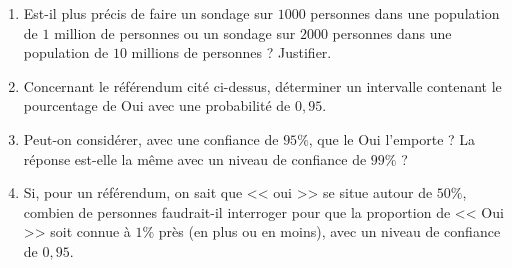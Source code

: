 \titre{  }
\auteur{}



\begin{enumerate}
	\item Est-il plus précis de faire un sondage sur $1000$ personnes dans une population de $1$ million de personnes ou un sondage sur $2000$ personnes dans une population de $10$ millions de personnes ? Justifier.
	\item Concernant le référendum cité ci-dessus, déterminer un intervalle contenant le pourcentage de Oui avec une probabilité de $0{,}95$.
	\item Peut-on considérer, avec une confiance de $95\%$, que le Oui l'emporte ? La réponse est-elle
	la même avec un niveau de confiance de $99\%$ ?
	\item Si, pour un référendum, on sait que << oui >> se situe autour de $50\%$, combien de personnes
	faudrait-il interroger pour que la proportion de << Oui >> soit connue à $1\%$ près (en plus ou en
	moins), avec un niveau de confiance de $0{,}95$.
\end{enumerate}